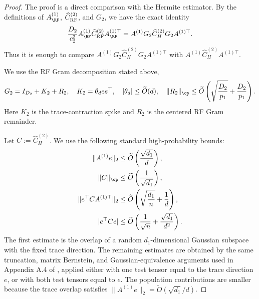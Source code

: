 \begin{proof}
The proof is a direct comparison with the Hermite estimator. By the
definitions of $A_{\RF}^{(1)}$, $\widehat C_{\rm RF}^{(2)}$, and $G_2$, we
have the exact identity
\begin{align}
    \frac{D_2}{c_2^2}
    A_{\RF}^{(1)}
    \widehat C_{\rm RF}^{(2)}
    A_{\RF}^{(1)\top}
    =
    A^{(1)}G_2\widehat C_H^{(2)}G_2A^{(1)\top}.
\end{align}
Thus it is enough to compare
$A^{(1)}G_2\widehat C_H^{(2)}G_2A^{(1)\top}$ with
$A^{(1)}\widehat C_H^{(2)}A^{(1)\top}$.

We use the RF Gram decomposition stated above,
\[
    G_2=I_{D_2}+K_2+R_2,
    \quad
    K_2=\theta_d ee^\top,
    \quad
    |\theta_d|\le \widetilde O(d),
    \quad
    \|R_2\|_{\op} \le
    \widetilde O \left(
        \sqrt{\frac{D_2}{p_1}}
        +
        \frac{D_2}{p_1}
    \right).
\]
Here $K_2$ is the trace-contraction spike and $R_2$ is the centered RF
Gram remainder.

Let $C:=\widehat C_H^{(2)}$. We use the following standard high-probability
bounds:
\begin{align}
    \|A^{(1)}e\|_2
    &\le
    \widetilde O \left(\frac{\sqrt{d_1}}{d}\right),
    \label{2605:eq:Ae-bound}
    \\
    \|C\|_{\op}
    &\le
    \widetilde O \left(\frac1{\sqrt{d_1}}\right),
    \label{2605:eq:C-op-bound}
    \\
    \|e^\top C A^{(1)\top}\|_2
    &\le
    \widetilde O \left(
        \sqrt{\frac{d_1}{n}}+\frac1d
    \right),
    \label{2605:eq:eCA-bound}
    \\
    |e^\top C e|
    &\le
    \widetilde O \left(
        \frac1{\sqrt n}
        +
        \frac{\sqrt{d_1}}{d^2}
    \right).
    \label{2605:eq:eCe-bound}
\end{align}
The first estimate is the overlap of a random $d_1$-dimensional Gaussian subspace with the fixed trace direction. The remaining estimates are obtained by the same truncation, matrix Bernstein, and Gaussian-equivalence arguments used in Appendix A.4 of \cite{tabanelli2026deep}, applied either with one test tensor equal to the trace direction $e$, or with both test tensors equal to $e$. The population contributions are smaller because the trace overlap satisfies $\|A^{(1)}e\|_2=\widetilde O(\sqrt{d_1}/d)$.


\end{proof}
